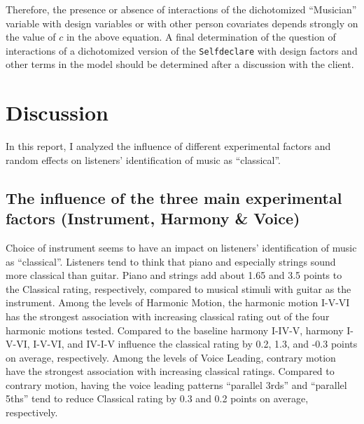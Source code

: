 \documentclass{article}
\begin{document}
Therefore, the presence or absence of interactions of the dichotomized ``Musician'' variable with design variables or with other person covariates depends strongly on the value of $c$ in the above equation. A final determination of the question of interactions of a dichotomized version of the \texttt{Selfdeclare} with design factors and other terms in the model should be determined after a discussion with the client.

\section{Discussion}



In this report, I analyzed the influence of different experimental factors and random effects on listeners' identification of music as ``classical''.

\subsection{The influence of the three main experimental factors (Instrument, Harmony \& Voice)}

Choice of instrument seems to have an impact on listeners' identification of music as ``classical''. Listeners tend to think that piano and especially strings sound more classical than guitar. Piano and strings add about 1.65 and 3.5 points to the Classical rating, respectively, compared to musical stimuli with guitar as the instrument. Among the levels of Harmonic Motion, the harmonic motion I-V-VI has the strongest association with increasing classical rating out of the four harmonic motions tested. Compared to the baseline harmony I-IV-V, harmony I-V-VI, I-V-VI, and IV-I-V influence the classical rating by 0.2, 1.3, and -0.3 points on average, respectively. Among the levels of Voice Leading, contrary motion have the strongest association with increasing classical ratings. Compared to contrary motion, having the voice leading patterns ``parallel 3rds'' and ``parallel 5ths'' tend to reduce Classical rating by 0.3 and 0.2 points on average, respectively.
\end{document}
